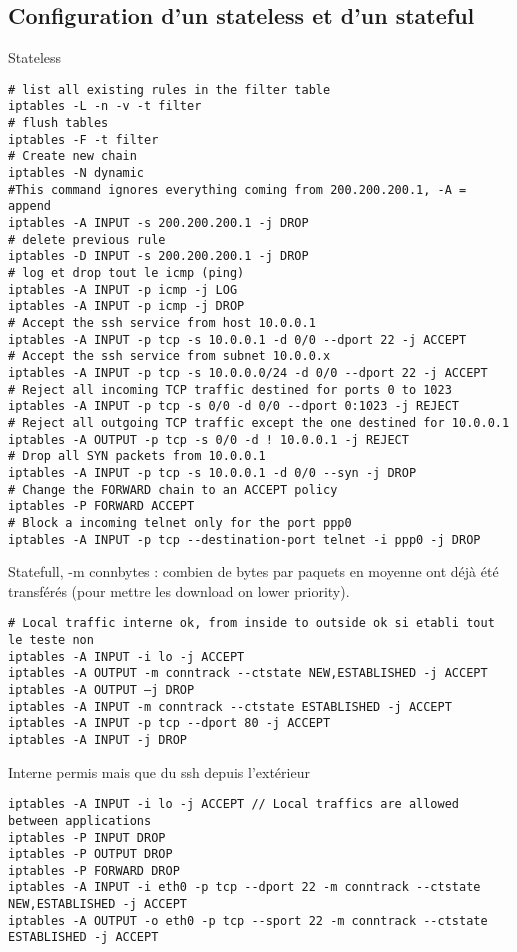 \subsection{Configuration d'un stateless et d'un stateful}
Stateless
\begin{Verbatim}[breaklines=true, breakanywhere=true]
# list all existing rules in the filter table
iptables -L -n -v -t filter
# flush tables
iptables -F -t filter
# Create new chain
iptables -N dynamic
#This command ignores everything coming from 200.200.200.1, -A = append
iptables -A INPUT -s 200.200.200.1 -j DROP
# delete previous rule
iptables -D INPUT -s 200.200.200.1 -j DROP
# log et drop tout le icmp (ping)
iptables -A INPUT -p icmp -j LOG
iptables -A INPUT -p icmp -j DROP
# Accept the ssh service from host 10.0.0.1
iptables -A INPUT -p tcp -s 10.0.0.1 -d 0/0 --dport 22 -j ACCEPT
# Accept the ssh service from subnet 10.0.0.x
iptables -A INPUT -p tcp -s 10.0.0.0/24 -d 0/0 --dport 22 -j ACCEPT
# Reject all incoming TCP traffic destined for ports 0 to 1023
iptables -A INPUT -p tcp -s 0/0 -d 0/0 --dport 0:1023 -j REJECT
# Reject all outgoing TCP traffic except the one destined for 10.0.0.1
iptables -A OUTPUT -p tcp -s 0/0 -d ! 10.0.0.1 -j REJECT
# Drop all SYN packets from 10.0.0.1
iptables -A INPUT -p tcp -s 10.0.0.1 -d 0/0 --syn -j DROP
# Change the FORWARD chain to an ACCEPT policy
iptables -P FORWARD ACCEPT
# Block a incoming telnet only for the port ppp0
iptables -A INPUT -p tcp --destination-port telnet -i ppp0 -j DROP
\end{Verbatim}
Statefull, -m connbytes : combien de bytes par paquets en moyenne ont déjà été transférés (pour mettre les download on lower priority).
\begin{Verbatim}[breaklines=true, breakanywhere=true]
# Local traffic interne ok, from inside to outside ok si etabli tout le teste non
iptables -A INPUT -i lo -j ACCEPT
iptables -A OUTPUT -m conntrack --ctstate NEW,ESTABLISHED -j ACCEPT
iptables -A OUTPUT –j DROP
iptables -A INPUT -m conntrack --ctstate ESTABLISHED -j ACCEPT
iptables -A INPUT -p tcp --dport 80 -j ACCEPT
iptables -A INPUT -j DROP
\end{Verbatim}
Interne permis mais que du ssh depuis l'extérieur
\begin{Verbatim}[breaklines=true, breakanywhere=true]
iptables -A INPUT -i lo -j ACCEPT // Local traffics are allowed between applications
iptables -P INPUT DROP
iptables -P OUTPUT DROP
iptables -P FORWARD DROP
iptables -A INPUT -i eth0 -p tcp --dport 22 -m conntrack --ctstate NEW,ESTABLISHED -j ACCEPT
iptables -A OUTPUT -o eth0 -p tcp --sport 22 -m conntrack --ctstate ESTABLISHED -j ACCEPT
\end{Verbatim}
